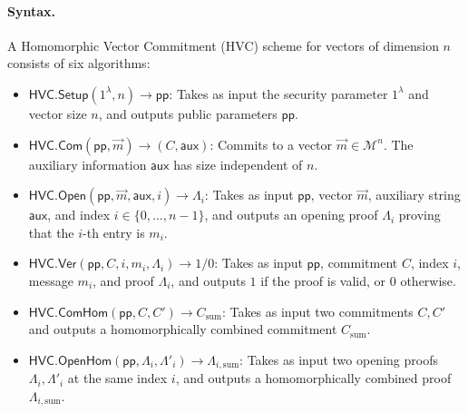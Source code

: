 \paragraph{Syntax.}
A Homomorphic Vector Commitment (HVC) scheme for vectors of dimension $n$ consists of six algorithms:
\begin{itemize}
    \item $\mathsf{HVC.Setup}(1^\lambda, n) \to \mathsf{pp}$: Takes as input the security parameter $1^\lambda$ and vector size $n$, and outputs public parameters $\mathsf{pp}$.
    \item $\mathsf{HVC.Com}(\mathsf{pp}, \vec{m}) \to (C, \mathsf{aux})$: Commits to a vector $\vec m\in\mathcal M^n$. The auxiliary information $\mathsf{aux}$ has size independent of $n$.
    \item $\mathsf{HVC.Open}(\mathsf{pp}, \vec{m}, \mathsf{aux}, i) \to \Lambda_i$: Takes as input $\mathsf{pp}$, vector $\vec{m}$, auxiliary string $\mathsf{aux}$, and index $i \in \{0, \dots, n-1\}$, and outputs an opening proof $\Lambda_i$ proving that the $i$-th entry is $m_i$.
    \item $\mathsf{HVC.Ver}(\mathsf{pp}, C, i, m_i, \Lambda_i) \to 1 / 0$: Takes as input $\mathsf{pp}$, commitment $C$, index $i$, message $m_i$, and proof $\Lambda_i$, and outputs $1$ if the proof is valid, or $0$ otherwise.
    \item $\mathsf{HVC.ComHom}(\mathsf{pp}, C, C') \to C_{\mathrm{sum}}$: Takes as input two commitments $C, C'$ and outputs a homomorphically combined commitment $C_{\mathrm{sum}}$.
    \item $\mathsf{HVC.OpenHom}(\mathsf{pp}, \Lambda_i, \Lambda'_i) \to \Lambda_{i, \mathrm{sum}}$: Takes as input two opening proofs $\Lambda_i, \Lambda'_i$ at the same index $i$, and outputs a homomorphically combined proof $\Lambda_{i, \mathrm{sum}}$.
\end{itemize}

